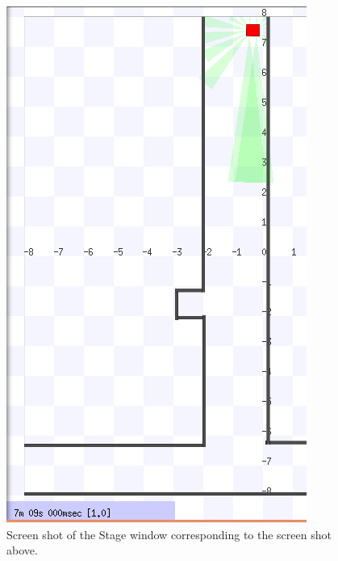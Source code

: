 \documentclass[a4paper,12pt]{article}
\begin{document}
\begin{figure}[H]
\includegraphics[scale=0.9]{RunS3.png}
\caption{Screen shot of the Stage window corresponding to the screen shot above.}
\end{figure}
\end{document}
